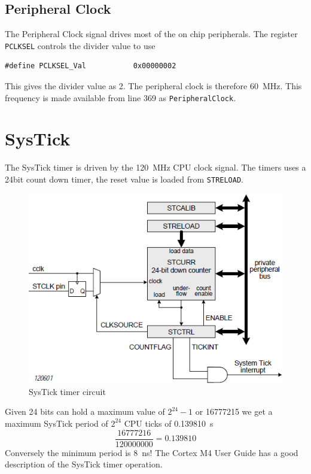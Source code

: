 \documentclass[a4paper]{tufte-handout}
\begin{document}
\subsection{Peripheral Clock}
The Peripheral Clock signal drives most of the on chip peripherals.
The register \texttt{PCLKSEL} \citep[sectin 3.3.3.5, table
23]{lpc4088} controls the divider value to use
\begin{verbatim}
#define PCLKSEL_Val           0x00000002
\end{verbatim}
This gives the divider value as 2.  The peripheral clock is therefore
\SI{60}{\mega\hertz}.  This frequency is made available
from  line 369 as
\texttt{PeripheralClock}.

\section{SysTick}
The SysTick timer is driven by the \SI{120}{\mega\hertz} CPU clock
signal.  The timers  uses a 24bit count down timer, the reset value is
loaded from \texttt{STRELOAD}.
\begin{figure}[h]
  \includegraphics[scale=0.5]{systick}
  \caption{SysTick timer circuit}
  \label{fig:systick}
\end{figure}
Given 24 bits can hold a maximum value of $2^{24}-1$ or \num{16777215}
we get a maximum SysTick period of $2^{24}$ CPU ticks of \SI{0.139810}{s}
\[
  \frac{16777216}{120000000} = 0.139810
\]
Conversely the minimum period is \SI{8}{\nano\second}!
The Cortex M4 User Guide \citep{cortex_m4_user_guide} has a good
description of the SysTick timer operation.
\end{document}
